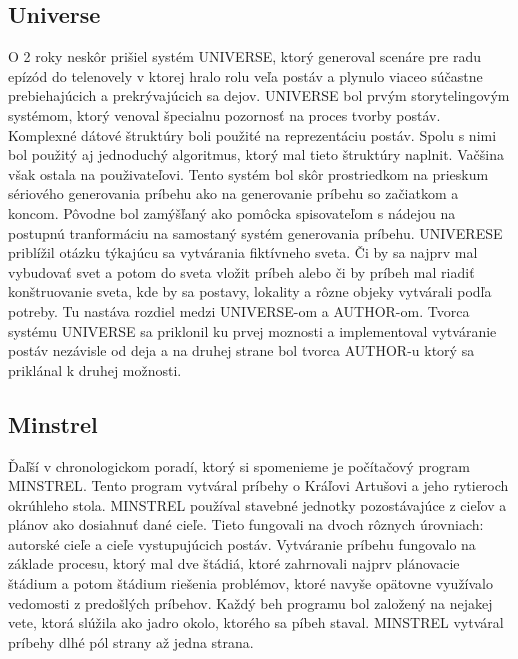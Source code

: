 \subsection{Universe}
O 2 roky neskôr prišiel systém UNIVERSE\cite{universe}, ktorý generoval scenáre pre radu epízód do telenovely v ktorej hralo rolu veľa postáv a plynulo viaceo súčastne prebiehajúcich a prekrývajúcich sa dejov. UNIVERSE bol prvým storytelingovým systémom, ktorý venoval špecialnu pozornosť na proces tvorby postáv. Komplexné dátové štruktúry boli použité na reprezentáciu postáv. Spolu s nimi bol použitý aj jednoduchý algoritmus, ktorý mal tieto štruktúry naplnit. Vačšina však ostala na použivateľovi. Tento systém bol skôr prostriedkom na prieskum sériového generovania príbehu ako na generovanie príbehu so začiatkom a koncom. Pôvodne bol zamýšľaný ako pomôcka spisovateľom s nádejou na postupnú tranformáciu na samostaný systém generovania príbehu. UNIVERESE priblížil otázku týkajúcu sa vytvárania fiktívneho sveta. Či by sa najprv mal vybudovať svet a potom do sveta vložit príbeh alebo či by príbeh mal riadiť konštruovanie sveta, kde by sa postavy, lokality a rôzne objeky vytvárali podľa potreby. Tu nastáva rozdiel medzi UNIVERSE-om a AUTHOR-om. Tvorca systému UNIVERSE sa priklonil ku prvej moznosti a implementoval vytváranie postáv nezávisle od deja a na druhej strane bol tvorca AUTHOR-u ktorý sa priklánal k druhej možnosti.\par
\subsection{Minstrel}
Ďaľší v chronologickom poradí, ktorý si spomenieme je počítačový program MINSTREL\cite{minstrel}. Tento program vytváral príbehy o Kráľovi Artušovi a jeho rytieroch okrúhleho stola. MINSTREL používal stavebné jednotky pozostávajúce z cieľov a plánov ako dosiahnuť dané cieľe. Tieto fungovali na dvoch rôznych úrovniach: autorské cieľe a cieľe vystupujúcich postáv. Vytváranie príbehu fungovalo na základe procesu, ktorý mal dve štádiá, ktoré zahrnovali najprv plánovacie štádium a potom štádium riešenia problémov, ktoré navyše opätovne využívalo vedomosti z predošlých príbehov. Každý beh programu bol založený na nejakej vete, ktorá slúžila ako jadro okolo, ktorého sa píbeh staval.  MINSTREL vytváral príbehy dlhé pól strany až jedna strana.\par
